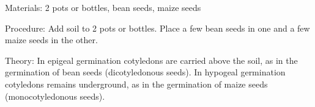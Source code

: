 \begin{multicols}{2}
\begin{description*}
\item[Materials:]{2 pots or bottles, bean seeds, maize seeds}
\item[Procedure:]{Add soil to 2 pots or bottles. Place a few bean seeds in one and a few maize seeds in the other.}
\item[Theory:]{In epigeal germination cotyledons are carried above the soil, as in the germination of bean seeds (dicotyledonous seeds). In hypogeal germination cotyledons remains underground, as in the germination of maize seeds (monocotyledonous
seeds).}
\end{description*}



\end{multicols}

\pagebreak